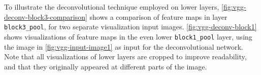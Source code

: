 \noindent To illustrate the deconvolutional technique employed on lower layers, \autoref{fig:vgg-deconv-block3-comparison} shows a comparison of feature maps in layer \texttt{block3\_pool}, for two separate visualization input images. \autoref{fig:vgg-deconv-block1} shows visualizations of feature maps in the even lower \texttt{block1\_pool} layer, using the image in \autoref{fig:vgg-input-image1} as input for the deconvolutional network. Note that all visualizations of lower layers are cropped to improve readability, and that they originally appeared at different parts of the image. 

\begin{figure}
\captionsetup[subfigure]{labelformat=empty}
\begin{center}



\end{center}
\end{figure}
